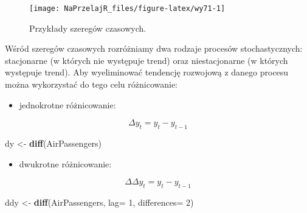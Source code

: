 \documentclass[polish,]{book}
\newenvironment{Shaded}{\begin{snugshade}}{\end{snugshade}}
\newcommand{\DataTypeTok}[1]{\textcolor[rgb]{0.13,0.29,0.53}{#1}}
\newcommand{\DecValTok}[1]{\textcolor[rgb]{0.00,0.00,0.81}{#1}}
\newcommand{\KeywordTok}[1]{\textcolor[rgb]{0.13,0.29,0.53}{\textbf{#1}}}
\newcommand{\NormalTok}[1]{#1}
\newcommand{\StringTok}[1]{\textcolor[rgb]{0.31,0.60,0.02}{#1}}
\providecommand{\tightlist}{%
  \setlength{\itemsep}{0pt}\setlength{\parskip}{0pt}}
\begin{document}
\begin{figure}[h]

{\centering \texttt{[image: NaPrzelajR\_files/figure-latex/wy71-1]} 

}

\caption{Przykłady szeregów czasowych.}\label{fig:wy71}
\end{figure}

Wśród szeregów czasowych rozróżniamy dwa rodzaje procesów stochastycznych:
stacjonarne (w których nie występuje trend) oraz niestacjonarne (w których występuje trend). Aby wyeliminować tendencję rozwojową z danego procesu można
wykorzystać do tego celu różnicowanie:

\begin{itemize}
\tightlist
\item
  jednokrotne różnicowanie:
\end{itemize}

\begin{equation}
\Delta y_t=y_t-y_{t-1}
\label{eq:wz01}
\end{equation}

\begin{Shaded}
\begin{Highlighting}[]
\NormalTok{dy <-}\StringTok{ }\KeywordTok{diff}\NormalTok{(AirPassengers)}
\end{Highlighting}
\end{Shaded}

\begin{itemize}
\tightlist
\item
  dwukrotne różnicowanie:
\end{itemize}

\begin{equation}
\Delta\Delta y_t=y_t-y_{t-1}
\label{eq:wz02}
\end{equation}

\begin{Shaded}
\begin{Highlighting}[]
\NormalTok{ddy <-}\StringTok{ }\KeywordTok{diff}\NormalTok{(AirPassengers, }\DataTypeTok{lag=} \DecValTok{1}\NormalTok{, }\DataTypeTok{differences=} \DecValTok{2}\NormalTok{)}
\end{Highlighting}
\end{Shaded}
\end{document}
